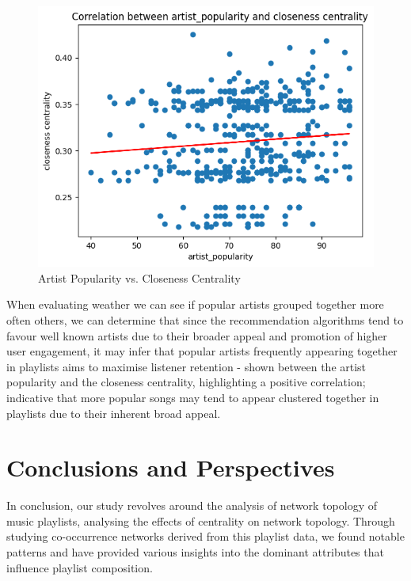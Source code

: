 \documentclass[conference]{IEEEtran}
\begin{document}
\begin{figure}[h!]
    \centering
    \includegraphics[width=1\linewidth]{images/4.png}
    \caption{Artist Popularity vs. Closeness Centrality}
    \label{fig:enter-label}
\end{figure}

When evaluating weather we can see if popular artists grouped together more often others, we can determine that since the recommendation algorithms tend to favour well known artists due to their broader appeal and promotion of higher user engagement, it may infer that popular artists frequently appearing together in playlists aims to maximise listener retention - shown between the artist popularity and the closeness centrality, highlighting a positive correlation; indicative that more popular songs may tend to appear clustered together in playlists due to their inherent broad appeal.
\\



\section{Conclusions and Perspectives}

In conclusion, our study revolves around the analysis of network topology of music playlists, analysing the effects of centrality on network topology. Through studying co-occurrence networks derived from this playlist data, we found notable patterns and have provided various insights into the dominant attributes that influence playlist composition. \\
\end{document}
